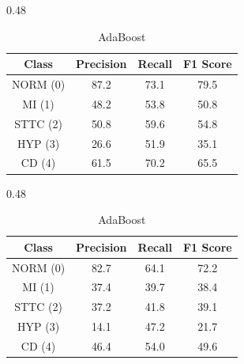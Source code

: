 \begin{table}[H]
    \bigskip

    \begin{subtable}[t]{0.48\textwidth}
        \centering
        \caption{Histogram–based Gradient Boosting}
        \label{tab:cv_gb_part2}
        \begin{tabular}{cccc}
            \toprule
            Class & Precision & Recall & F1 Score \\
            \midrule
            NORM (0) & 87.2 & 73.1 & 79.5 \\
            MI   (1) & 48.2 & 53.8 & 50.8 \\
            STTC (2) & 50.8 & 59.6 & 54.8 \\
            HYP  (3) & 26.6 & 51.9 & 35.1 \\
            CD   (4) & 61.5 & 70.2 & 65.5 \\
            \bottomrule
        \end{tabular}
    \end{subtable}
    \hfill
    \begin{subtable}[t]{0.48\textwidth}
        \centering
        \caption{AdaBoost}
        \label{tab:cv_ada_part2}
        \begin{tabular}{cccc}
            \toprule
            Class & Precision & Recall & F1 Score \\
            \midrule
            NORM (0) & 82.7 & 64.1 & 72.2 \\
            MI   (1) & 37.4 & 39.7 & 38.4 \\
            STTC (2) & 37.2 & 41.8 & 39.1 \\
            HYP  (3) & 14.1 & 47.2 & 21.7 \\
            CD   (4) & 46.4 & 54.0 & 49.6 \\
            \bottomrule
        \end{tabular}
    \end{subtable}

    \bigskip


\end{table}
